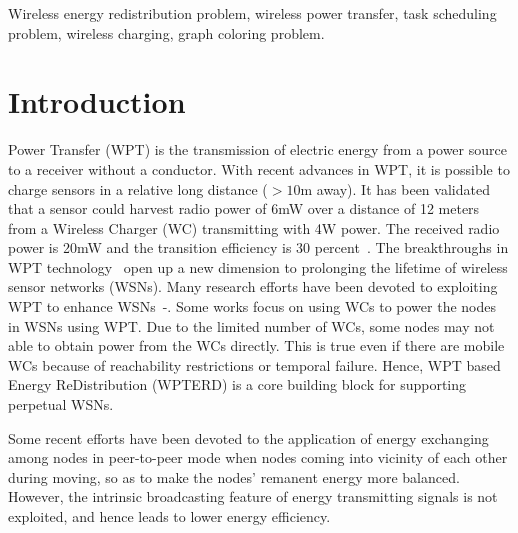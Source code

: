 \documentclass[12pt,journal,onecolumn,draftcls]{IEEEtran}
\begin{document}
\begin{IEEEkeywords}
Wireless energy redistribution problem, wireless power transfer, task scheduling problem, wireless charging, graph coloring problem.
\end{IEEEkeywords}


\IEEEpeerreviewmaketitle



\section{Introduction}
\label{sec_intro}
\newtheorem{lemma}{\textbf{Lemma}}
\newtheorem{theorem}{\textbf{Theorem}}
\newtheorem{property}{\textbf{P}}
\newtheorem{corollary}{\textbf{Corollary}}
%
%
%
%

 Power Transfer (WPT) is the transmission of electric energy from a power source to a receiver without a conductor. With recent advances in WPT, it is possible to charge sensors in a relative long distance (${>}10$m away)\cite{Guo2017}. It has been validated that a sensor could harvest radio power of 6mW over a distance of 12 meters from a Wireless Charger (WC) transmitting with 4W power. The received radio power is 20mW and the transition efficiency is 30 percent~\cite{Nintana2012}. The breakthroughs in WPT technology~\cite{Kurs2007, Cannon2009} open up a new dimension to prolonging the lifetime of wireless sensor networks (WSNs). Many research efforts have been devoted to exploiting WPT to enhance WSNs~\cite{Xiang2013}-\cite{Madhja2017}. Some works focus on using WCs to power the nodes in WSNs using WPT. Due to the limited number of WCs, some nodes may not able to obtain power from the WCs directly. This is true even if there are mobile WCs because of reachability restrictions or temporal failure. Hence, WPT based Energy ReDistribution (WPTERD) is a core building block for supporting perpetual WSNs.

Some recent efforts have been devoted to the application of energy exchanging among nodes in peer-to-peer mode when nodes coming into vicinity of each other during moving, so as to make the nodes' remanent energy more balanced. However, the intrinsic broadcasting feature of energy transmitting signals is not exploited, and hence leads to lower energy efficiency.
\end{document}
